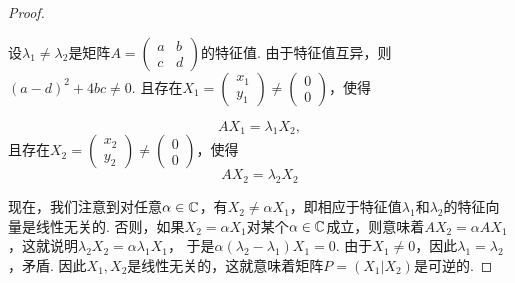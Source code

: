 \begin{proof}
  \begin{enuma}
    \item 设$\lambda_1\ne\lambda_2$是矩阵$A=\begin{pmatrix}
          a & b \\
          c & d
        \end{pmatrix}$的特征值. 由于特征值互异，则$(a-d)^2+4bc\ne0$. 且存在$X_1=\begin{pmatrix}
          x_1 \\ y_1
        \end{pmatrix}\ne\begin{pmatrix}
          0 \\ 0
        \end{pmatrix}$，使得
  \end{enuma}
    \begin{equation}\label{eq2.8}
      AX_1 = \lambda_1X_2,
    \end{equation}
    且存在$X_2=\begin{pmatrix}
      x_2 \\ y_2
    \end{pmatrix}\ne\begin{pmatrix}
      0 \\ 0
    \end{pmatrix}$，使得
    \begin{equation}\label{eq2.9}
      AX_2 = \lambda_2X_2
    \end{equation}

    现在，我们注意到对任意$\alpha\in\mathbb C$，有$X_2\ne\alpha X_1$，即相应于特征值$\lambda_1$和$\lambda_2$的特征向量是线性无关的. 否则，如果$X_2=\alpha X_1$对某个$\alpha\in\mathbb C$成立，则意味着$AX_2=\alpha AX_1$，这就说明$\lambda_2X_2=\alpha\lambda_1X_1$， 于是$\alpha(\lambda_2-\lambda_1)X_1=0$. 由于$X_1\ne0$，因此$\lambda_1=\lambda_2$，矛盾. 因此$X_1,X_2$是线性无关的，这就意味着矩阵$P=(X_1|X_2)$是可逆的.


\end{proof}
